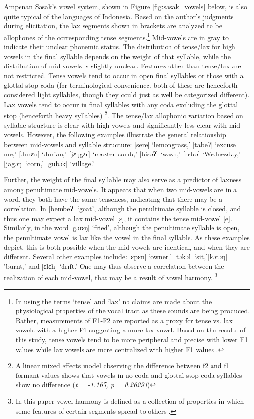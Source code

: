 \documentclass[12pt]{ouparticle}
\begin{document}
Ampenan Sasak’s vowel system, shown in Figure \ref{fig:sasak_vowels} below, is also quite typical of the languages of Indonesia. Based on the author's judgments during elicitation, the lax segments shown in brackets are analyzed to be allophones of the corresponding tense segments.\footnote{In using the terms `tense' and `lax' no claims are made about the physiological properties of the vocal tract as these sounds are being produced. Rather, measurements of F1-F2 are reported as a proxy for tense vs. lax vowels with a higher F1 suggesting a more lax vowel. Based on the results of this study, tense vowels tend to be more peripheral and precise with lower F1 values while lax vowels are more centralized with higher F1 values \citep{wood1975,halle1977}.}  Mid-vowels are in gray to indicate their unclear phonemic status. The distribution of tense/lax for high vowels in the final syllable depends on the weight of that syllable, while the distribution of mid vowels is slightly unclear. Features other than tense/lax are not restricted. Tense vowels tend to occur in open final syllables or those with a glottal stop coda (for terminological convenience, both of these are henceforth considered light syllables, though they could just as well be categorized different). Lax vowels tend to occur in final syllables with any coda excluding the glottal stop (henceforth heavy syllables) \footnote{A linear mixed effects model observing the difference between f2 and f1 formant values shows that vowels in no-coda and glottal stop-coda syllables show no difference (\textit{t = -1.167, p = 0.26291})}. The tense/lax allophonic variation based on syllable structure is clear with high vowels and significantly less clear with mid-vowels. However, the following examples illustrate the general relationship between mid-vowels and syllable structure: [sere] `lemongrass,' [tabeʔ] `excuse me,' [durɛn] `durian,' [jɛŋgɛr] `rooster comb,' [bisoʔ] `wash,' [rebo] `Wednesday,' [jagɔŋ] `corn,' [gubɔk] `village.'

Further, the weight of the final syllable may also serve as a predictor of laxness among penultimate mid-vowels. It appears that when two mid-vowels are in a word, they both have the same tenseness, indicating that there may be a correlation. In [bembeʔ] `goat', although the penultimate syllable is closed, and thus one may expect a lax mid-vowel [ɛ], it contains the tense mid-vowel [e]. Similarly, in the word [gɔɾɛŋ] `fried', although the penultimate syllable is open, the penultimate vowel is lax like the vowel in the final syllable. As these examples depict, this is both possible when the mid-vowels are identical, and when they are different. Several other examples include: [ɛpɛn] `owner,' [tɔkɔl] `sit,'[kɔtɔŋ] 'burnt,' and [ɛlɛh] `drift.' One may thus observe a correlation between the realization of each mid-vowel, that may be a result of vowel harmony. \footnote{In this paper vowel harmony is defined as a collection of properties in which some features of certain segments spread to others \citep{wood1975}.}
\end{document}
